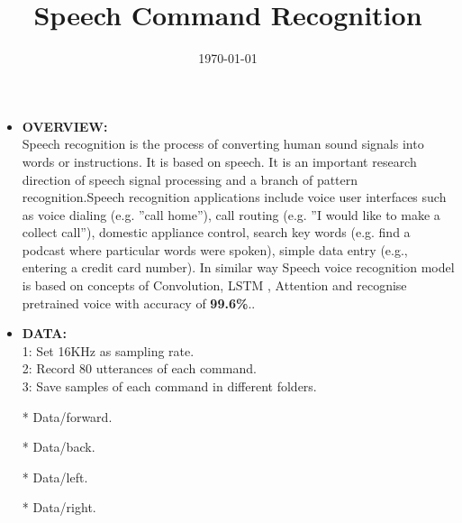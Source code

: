 \documentclass{article}
\begin{document}
\title{Speech Command Recognition}
\date{\today}
\maketitle
\begin{itemize}


\item{\textbf{OVERVIEW:}}\\

Speech recognition is the process of converting\vspace{3} human sound signals into words \vspace{3} or instructions. It is based on speech. It is an important research direction of speech signal processing\vspace{3} and a branch of pattern recognition.\vspace{3}Speech recognition applications include voice user interfaces such as voice dialing (e.g. ”call home”), call routing (e.g. ”I would like to make\vspace{3} a collect call”), domestic appliance control, search key words\vspace{3} (e.g. find a podcast where particular words were spoken), simple data entry\vspace{3} (e.g., entering a credit card number).\vspace{3} In similar way Speech voice recognition model is based on concepts of \vspace{3}Convolution, LSTM , Attention and recognise pretrained voice with accuracy of \textbf{99.6\%}..\\

\item{\textbf{DATA:}}\\

1: Set 16KHz as sampling rate.\\

2: Record 80 utterances of each command.\\

3: Save samples of each command in different folders.\\


\item[*]{Data/forward}.

\item[*]{Data/back}.

\item[*]{Data/left}.

\item[*]{Data/right}.


\end{itemize}
\end{document}
